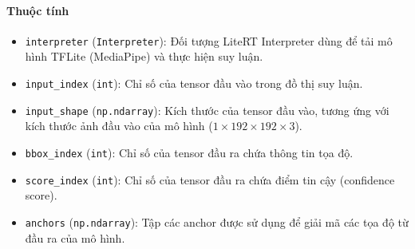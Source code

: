 \paragraph{Thuộc tính}
\begin{itemize}
    \item \texttt{interpreter} (\texttt{Interpreter}): Đối tượng LiteRT Interpreter dùng để tải mô hình TFLite (MediaPipe) và thực hiện suy luận.
    \item \texttt{input\_index} (\texttt{int}): Chỉ số của tensor đầu vào trong đồ thị suy luận.

    \item \texttt{input\_shape} (\texttt{np.ndarray}): Kích thước của tensor đầu vào, tương ứng với kích thước ảnh đầu vào của mô hình ($1 \times 192 \times 192 \times 3$).

    \item \texttt{bbox\_index} (\texttt{int}): Chỉ số của tensor đầu ra chứa thông tin tọa độ.

    \item \texttt{score\_index} (\texttt{int}): Chỉ số của tensor đầu ra chứa điểm tin cậy (confidence score).

    \item \texttt{anchors} (\texttt{np.ndarray}): Tập các anchor được sử dụng để giải mã các tọa độ từ đầu ra của mô hình.
\end{itemize}
